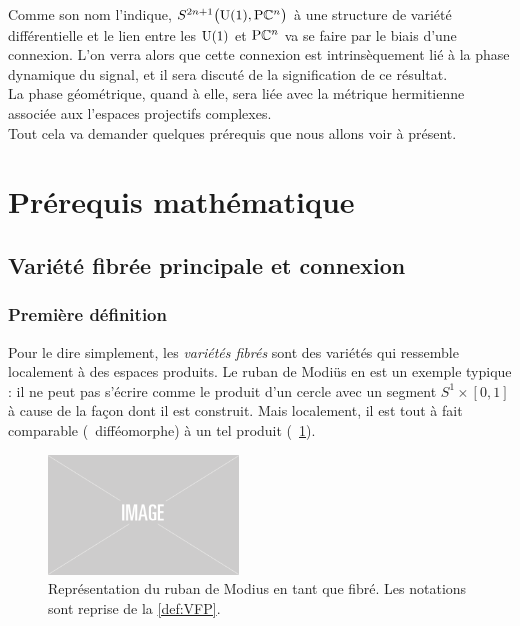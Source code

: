 Comme son nom l'indique, $S^{2n+1}\big(\text{\normalfont U}(1),\text{\normalfont P}\mathbb{C}^{n}\big)$ à une structure de variété différentielle et le lien entre les $\text{\normalfont U}(1)$ et $\text{\normalfont P}\mathbb{C}^{n}$ va se faire par le biais d'une connexion. L'on verra alors que cette connexion est intrinsèquement lié à la phase dynamique du signal, et il sera discuté de la signification de ce résultat.
\\
La phase géométrique, quand à elle, sera liée avec la métrique hermitienne associée aux l'espaces projectifs complexes.
\\
Tout cela va demander quelques prérequis que nous allons voir à présent.
\\



\section{Prérequis mathématique}

\subsection{Variété fibrée principale et connexion} \label{subsec:VFP}

\subsubsection{Première définition}

Pour le dire simplement, les \emph{variétés fibrés} sont des variétés qui ressemble localement à des espaces produits. 
Le ruban de Modiüs en est un exemple typique : il ne peut pas s'écrire comme le produit d'un cercle avec un segment $S^{1}\times [0,1]$ à cause de la façon dont il est construit. Mais localement, il est tout à fait comparable (\ie~difféomorphe) à un tel produit (\cf~\cref{fig:ruban2modius}).
\begin{figure}[h]
	\includegraphics[width=0.45\textwidth]{fig/placeholder}
	\caption[Ruban de Mobius comme variété fibrée]{Représentation du ruban de Modius en tant que fibré. Les notations sont reprise de la \cref{def:VFP}.}
	\label{fig:ruban2modius}
\end{figure}
\skipl

